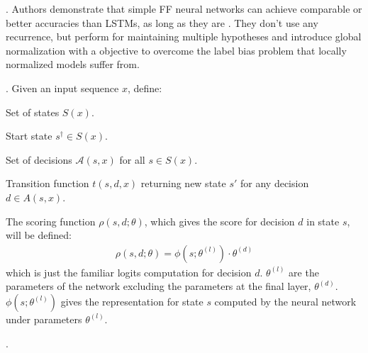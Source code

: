 \documentclass[11pt]{article}
\newcommand\myspace[1][]{\vspace{#1\bigskipamount}}
\newcommand\p{\Needspace{10\baselineskip} \noindent}
\begin{document}
\p {}. Authors demonstrate that simple FF neural networks can achieve comparable or better accuracies than LSTMs, as long as they are . They don't use any recurrence, but perform  for maintaining multiple hypotheses and introduce global normalization with a  objective to overcome the label bias problem that locally normalized models suffer from. 

\myspace 
\p {}. Given an input sequence $x$, define:
\begin{compactitem}
	\item Set of states $S(x)$.
	\item Start state $s^{\dagger} \in S(x)$.
	\item Set of decisions $\mathcal{A}(s, x)$ for all $s \in S(x)$. 
	\item Transition function $t(s, d, x)$ returning new state $s'$ for any decision $d \in A(s, x)$.  
\end{compactitem}
The scoring function $\rho(s, d; \theta)$, which gives the score for decision $d$ in state $s$, will be defined:
\begin{align}
	\rho(s, d; \theta) = \phi(s; \theta^{(l)}) \cdot \theta^{(d)}
\end{align}
which is just the familiar logits computation for decision $d$. $\theta^{(l)}$ are the parameters of the network excluding the parameters at the final layer, $\theta^{(d)}$. $\phi(s; \theta^{(l)})$ gives the representation for state $s$ computed by the neural network under parameters $\theta^{(l)}$.

\myspace
\p {}. 
\end{document}
